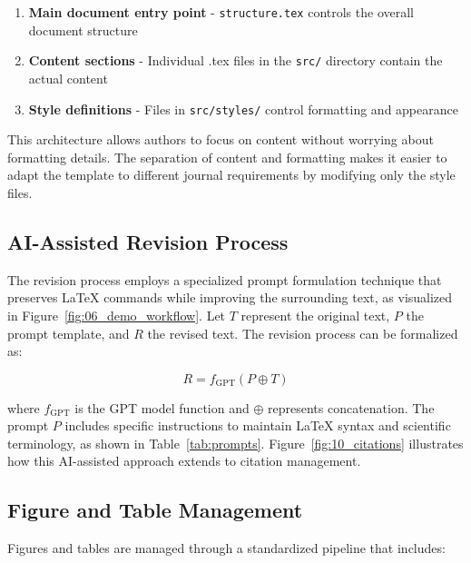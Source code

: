 \documentclass[preprint,review,12pt]{elsarticle}\n
\begin{document}
\begin{enumerate}
    \item \textbf{Main document entry point} - \verb|structure.tex| controls the overall document structure
    \item \textbf{Content sections} - Individual .tex files in the \verb|src/| directory contain the actual content
    \item \textbf{Style definitions} - Files in \verb|src/styles/| control formatting and appearance
\end{enumerate}

This architecture allows authors to focus on content without worrying about formatting details. The separation of content and formatting makes it easier to adapt the template to different journal requirements by modifying only the style files.


\subsection{AI-Assisted Revision Process}
\label{subsec:ai-revision}

The revision process employs a specialized prompt formulation technique that preserves LaTeX commands while improving the surrounding text, as visualized in Figure~\ref{fig:06_demo_workflow}. Let $T$ represent the original text, $P$ the prompt template, and $R$ the revised text. The revision process can be formalized as:

\begin{equation}
R = f_{\text{GPT}}(P \oplus T)
\end{equation}

where $f_{\text{GPT}}$ is the GPT model function and $\oplus$ represents concatenation. The prompt $P$ includes specific instructions to maintain LaTeX syntax and scientific terminology, as shown in Table~\ref{tab:prompts}. Figure~\ref{fig:10_citations} illustrates how this AI-assisted approach extends to citation management.


\subsection{Figure and Table Management}
\label{subsec:figure-management}

Figures and tables are managed through a standardized pipeline that includes:
\end{document}
